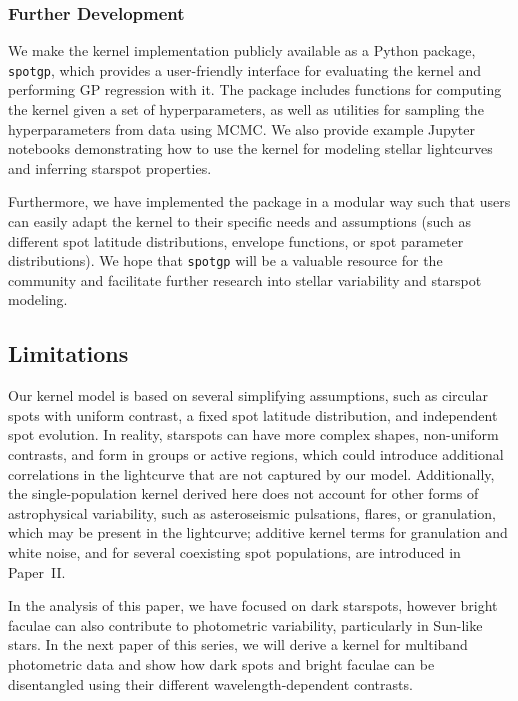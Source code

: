 \documentclass[preprint]{aastex702}
\newcommand{\code}[1]{{\texttt{#1}}}
\begin{document}
\subsubsection{Further Development}

We make the kernel implementation publicly available as a Python package, \code{spotgp}, which provides a user-friendly interface for evaluating the kernel and performing GP regression with it. The package includes functions for computing the kernel given a set of hyperparameters, as well as utilities for sampling the hyperparameters from data using MCMC. We also provide example Jupyter notebooks demonstrating how to use the kernel for modeling stellar lightcurves and inferring starspot properties. 

Furthermore, we have implemented the package in a modular way such that users can easily adapt the kernel to their specific needs and assumptions (such as different spot latitude distributions, envelope functions, or spot parameter distributions). We hope that \code{spotgp} will be a valuable resource for the community and facilitate further research into stellar variability and starspot modeling.

\subsection{Limitations} \label{sec:limitations} 

Our kernel model is based on several simplifying assumptions, such as circular spots with uniform contrast, a fixed spot latitude distribution, and independent spot evolution. In reality, starspots can have more complex shapes, non-uniform contrasts, and form in groups or active regions, which could introduce additional correlations in the lightcurve that are not captured by our model. Additionally, the single-population kernel derived here does not account for other forms of astrophysical variability, such as asteroseismic pulsations, flares, or granulation, which may be present in the lightcurve; additive kernel terms for granulation and white noise, and for several coexisting spot populations, are introduced in Paper~II.

In the analysis of this paper, we have focused on dark starspots, however bright faculae can also contribute to photometric variability, particularly in Sun-like stars. In the next paper of this series, we will derive a kernel for multiband photometric data and show how dark spots and bright faculae can be disentangled using their different wavelength-dependent contrasts.
\end{document}
